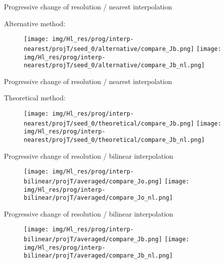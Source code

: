 \documentclass[francais]{beamer}
\begin{document}
\begin{frame}{Progressive change of resolution / nearest interpolation}
\begin{center}
Alternative method:
\begin{figure}
  \texttt{[image: img/Hl\_res/prog/interp-nearest/projT/seed\_0/alternative/compare\_Jb.png]}
\endminipage\hfill
{}
  \texttt{[image: img/Hl\_res/prog/interp-nearest/projT/seed\_0/alternative/compare\_Jb\_nl.png]}
\endminipage
\end{figure}
\end{center}
\end{frame}

\begin{frame}{Progressive change of resolution / nearest interpolation}
\begin{center}
Theoretical method:
\begin{figure}
  \texttt{[image: img/Hl\_res/prog/interp-nearest/projT/seed\_0/theoretical/compare\_Jb.png]}
\endminipage\hfill
{}
  \texttt{[image: img/Hl\_res/prog/interp-nearest/projT/seed\_0/theoretical/compare\_Jb\_nl.png]}
\endminipage
\end{figure}
\end{center}
\end{frame}

\begin{frame}{Progressive change of resolution / bilinear interpolation}
\begin{center}
\begin{figure}
  \texttt{[image: img/Hl\_res/prog/interp-bilinear/projT/averaged/compare\_Jo.png]}
\endminipage\hfill
{}
  \texttt{[image: img/Hl\_res/prog/interp-bilinear/projT/averaged/compare\_Jo\_nl.png]}
\endminipage
\end{figure}
\end{center}
\end{frame}

\begin{frame}{Progressive change of resolution / bilinear interpolation}
\begin{center}
\begin{figure}
  \texttt{[image: img/Hl\_res/prog/interp-bilinear/projT/averaged/compare\_Jb.png]}
\endminipage\hfill
{}
  \texttt{[image: img/Hl\_res/prog/interp-bilinear/projT/averaged/compare\_Jb\_nl.png]}
\endminipage
\end{figure}
\end{center}
\end{frame}
\end{document}
